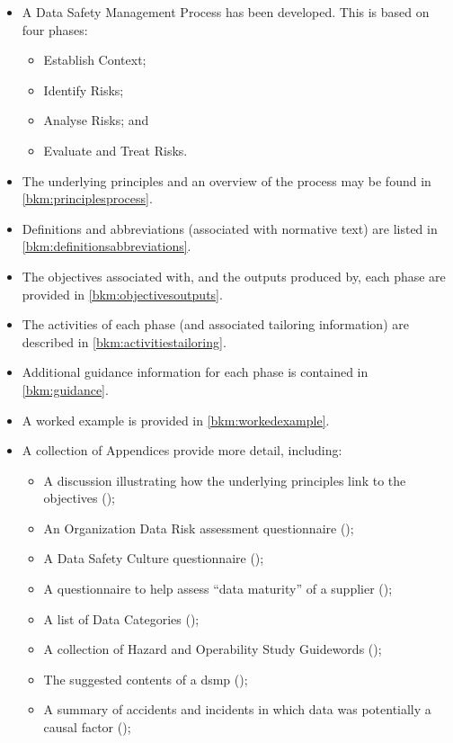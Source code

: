 \begin{itemize}
  \item A Data Safety Management Process has been developed. This is based on four phases:
    \begin{itemize}
      \item Establish Context;
      \item Identify Risks;
      \item Analyse Risks; and
      \item Evaluate and Treat Risks.
    \end{itemize}
	\item The underlying principles and an overview of the process may be found in \autoref{bkm:principlesprocess}.
	\item Definitions and abbreviations (associated with normative text) are listed in \autoref{bkm:definitionsabbreviations}.
	\item The objectives associated with, and the outputs produced by, each phase are provided in \autoref{bkm:objectivesoutputs}.
	\item The activities of each phase (and associated tailoring information) are described in \autoref{bkm:activitiestailoring}.
	\item Additional guidance information for each phase is contained in \autoref{bkm:guidance}.
  \item A worked example is provided in \autoref{bkm:workedexample}.
  \item A collection of Appendices provide more detail, including:
    \begin{itemize}
      \item A discussion illustrating how the underlying principles link to the objectives (); 
      \item An Organization Data Risk assessment questionnaire ();
      \item A Data Safety Culture questionnaire ();
      \item A questionnaire to help assess ``data maturity'' of a supplier ();
      \item A list of Data Categories ();
      \item A collection of Hazard and Operability Study Guidewords ();
      \item The suggested contents of a \gls{dsmp} ();
      \item A summary of accidents and incidents in which data was potentially a causal factor ();

\end{itemize}
\end{itemize}
